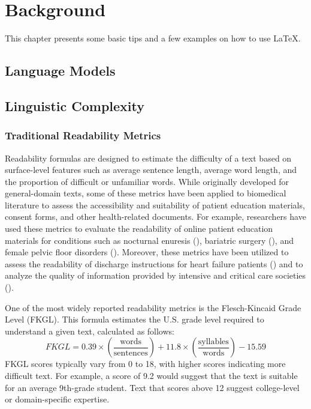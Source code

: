 \chapter{Background}
\label{c2}

This chapter presents some basic tips and a few examples on how to use \LaTeX.


\section{Language Models}
\label{c2:s:language-models}

\section{Linguistic Complexity}
\label{c2:s:linguistic-complexity}

\subsection{Traditional Readability Metrics}

Readability formulas are designed to estimate the difficulty of a text based on surface-level features such as average sentence length, average word length, and the proportion of difficult or unfamiliar words. While originally developed for general-domain texts, some of these metrics have been applied to biomedical literature to assess the accessibility and suitability of patient education materials, consent forms, and other health-related documents. For example, researchers have used these metrics to evaluate the readability of online patient education materials for conditions such as nocturnal enuresis (\cite{Fung2024-uh}), bariatric surgery (\cite{Lucy2023-zi}), and female pelvic floor disorders (\cite{Varli2023-ma}). Moreover, these metrics have been utilized to assess the readability of discharge instructions for heart failure patients (\cite{Tuan2023-wc}) and to analyze the quality of information provided by intensive and critical care societies (\cite{Hanci2024-wv}).

One of the most widely reported readability metrics is the Flesch-Kincaid Grade Level (FKGL). This formula estimates the U.S. grade level required to understand a given text, calculated as follows:
$$FKGL = 0.39 \times \left(\frac{\text{words}}{\text{sentences}}\right) + 11.8 \times \left(\frac{\text{syllables}}{\text{words}}\right) - 15.59$$
FKGL scores typically vary from 0 to 18, with higher scores indicating more difficult text. For example, a score of 9.2 would suggest that the text is suitable for an average 9th-grade student. Text that scores above 12 suggest college-level or domain-specific expertise.

